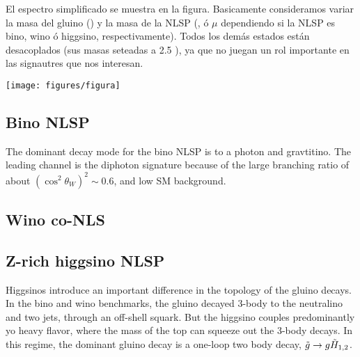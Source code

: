 El espectro simplificado se muestra en la figura. Basicamente consideramos variar la masa del gluino
() y la masa de la NLSP (,  ó $\mu$ dependiendo si la NLSP es bino, wino ó higgsino,
respectivamente). Todos los demás estados están desacoplados (sus masas seteadas a 2.5 \tev), ya que
no juegan un rol importante en las signautres que nos interesan.

\texttt{[image: figures/figura]} %




\subsection{Bino NLSP}

The dominant decay mode for the bino NLSP is to a photon and gravtitino. The leading channel is the diphoton signature because of the large branching ratio of about $(\cos^2\theta_W)^2 \sim 0.6$,
and low SM background.

\subsection{Wino co-NLS}

\subsection{Z-rich higgsino NLSP}

Higgsinos introduce  an important difference in the topology of the gluino decays. In the bino and wino benchmarks, the gluino decayed 3-body to the neutralino and two jets,
through an off-shell squark. But the higgsino couples predominantly yo heavy flavor, where the mass of the top can squeeze out the 3-body decays. In this regime, the dominant gluino decay is
a one-loop two body decay, $\tilde{g}\rightarrow g\tilde{H}_{1,2}$.

